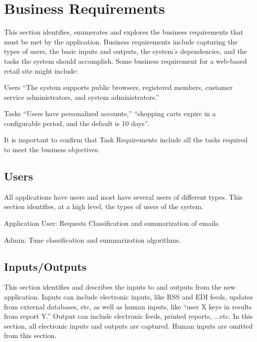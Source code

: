 \documentclass[a4paper,10pt]{article}
\newenvironment{my_enumerate}
{\begin{enumerate}
  \setlength{\itemsep}{0cm}
  \setlength{\parskip}{0cm}}
{\end{enumerate}}
\newenvironment{my_description}
{\begin{description}
  \setlength{\itemsep}{0cm}
  \setlength{\parskip}{0cm}}
{\end{description}}
\begin{document}
\section{Business Requirements}

This section identifies, enumerates and explores the business requirements that must 
be met by the application. Business requirements include capturing the types of users, 
the basic inputs and outputs, the system's dependencies, and the tasks the system should 
accomplish. Some business requirement for a web-based retail site might include:

\begin{my_description}
  \item[Users] ``The system supports public browsers, registered members, 
	      customer service administrators, and system administrators.''
  \item[Tasks] ``Users have personalized accounts,'' ``shopping carts expire 
	      in a configurable period, and the default is 10 days''.
\end{my_description}

It is important to confirm that Task Requirements include all the tasks 
required to meet the business objectives.

\subsection{Users}
All applications have users and most have several users of different types. This 
section identifies, at a high level, the types of users of the system.

\begin{my_enumerate}
  \item Application User: Requests Classification and summarization of emails.
  \item Admin: Tune classification and summarization algorithms.
\end{my_enumerate}

\subsection{Inputs/Outputs}
This section identifies and describes the inputs to and outputs from the new 
application. Inputs can include electronic inputs, like RSS and EDI feeds, 
updates from external databases, etc, as well as human inputs, like 
``user X keys in results from report Y.'' Output can include electronic feeds, 
printed reports, ...etc. In this section, all electronic inputs and outputs 
are captured. Human inputs are omitted from this section.
\end{document}

